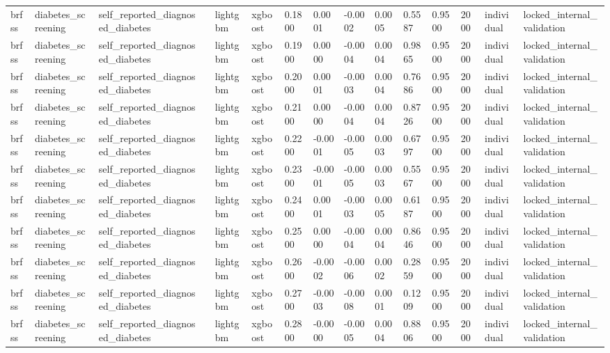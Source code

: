 \begin{tabular}{lllllllllllllll}
brfss & diabetes\_screening & self\_reported\_diagnosed\_diabetes &  & lightgbm & xgboost & 0.1800 & 0.0001 & -0.0002 & 0.0005 & 0.5587 & 0.9500 & 2000 & individual & locked\_internal\_validation \\
brfss & diabetes\_screening & self\_reported\_diagnosed\_diabetes &  & lightgbm & xgboost & 0.1900 & 0.0000 & -0.0004 & 0.0004 & 0.9865 & 0.9500 & 2000 & individual & locked\_internal\_validation \\
brfss & diabetes\_screening & self\_reported\_diagnosed\_diabetes &  & lightgbm & xgboost & 0.2000 & 0.0001 & -0.0003 & 0.0004 & 0.7686 & 0.9500 & 2000 & individual & locked\_internal\_validation \\
brfss & diabetes\_screening & self\_reported\_diagnosed\_diabetes &  & lightgbm & xgboost & 0.2100 & 0.0000 & -0.0004 & 0.0004 & 0.8726 & 0.9500 & 2000 & individual & locked\_internal\_validation \\
brfss & diabetes\_screening & self\_reported\_diagnosed\_diabetes &  & lightgbm & xgboost & 0.2200 & -0.0001 & -0.0005 & 0.0003 & 0.6797 & 0.9500 & 2000 & individual & locked\_internal\_validation \\
brfss & diabetes\_screening & self\_reported\_diagnosed\_diabetes &  & lightgbm & xgboost & 0.2300 & -0.0001 & -0.0005 & 0.0003 & 0.5567 & 0.9500 & 2000 & individual & locked\_internal\_validation \\
brfss & diabetes\_screening & self\_reported\_diagnosed\_diabetes &  & lightgbm & xgboost & 0.2400 & 0.0001 & -0.0003 & 0.0005 & 0.6187 & 0.9500 & 2000 & individual & locked\_internal\_validation \\
brfss & diabetes\_screening & self\_reported\_diagnosed\_diabetes &  & lightgbm & xgboost & 0.2500 & 0.0000 & -0.0004 & 0.0004 & 0.8646 & 0.9500 & 2000 & individual & locked\_internal\_validation \\
brfss & diabetes\_screening & self\_reported\_diagnosed\_diabetes &  & lightgbm & xgboost & 0.2600 & -0.0002 & -0.0006 & 0.0002 & 0.2859 & 0.9500 & 2000 & individual & locked\_internal\_validation \\
brfss & diabetes\_screening & self\_reported\_diagnosed\_diabetes &  & lightgbm & xgboost & 0.2700 & -0.0003 & -0.0008 & 0.0001 & 0.1209 & 0.9500 & 2000 & individual & locked\_internal\_validation \\
brfss & diabetes\_screening & self\_reported\_diagnosed\_diabetes &  & lightgbm & xgboost & 0.2800 & -0.0000 & -0.0005 & 0.0004 & 0.8806 & 0.9500 & 2000 & individual & locked\_internal\_validation \\

\end{tabular}
